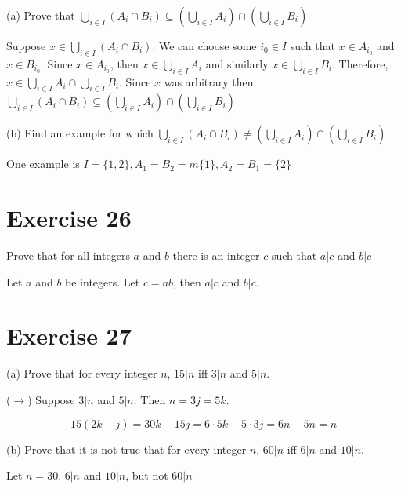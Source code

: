\documentclass[11pt]{article}
\begin{document}
\noindent (a) Prove that 
$\bigcup_{i \in I} (A_i \cap B_i) \subseteq (\bigcup_{i \in I} A_i) \cap (\bigcup_{i \in I} B_i)$

Suppose $x \in \bigcup_{i \in I} (A_i \cap B_i)$. We can choose some $i_0 \in I$ 
such that $x \in A_{i_0}$ and $x \in B_{i_0}$. Since $x \in A_{i_0}$, then 
$x \in \bigcup_{i \in I} A_i$ and similarly $x \in \bigcup_{i \in I} B_i$.
Therefore, $x \in \bigcup_{i \in I} A_i \cap \bigcup_{i \in I} B_i$.
Since $x$ was arbitrary then 
$\bigcup_{i \in I} (A_i \cap B_i) \subseteq (\bigcup_{i \in I} A_i) \cap (\bigcup_{i \in I} B_i)$

\noindent (b) Find an example for which 
$\bigcup_{i \in I} (A_i \cap B_i) \neq (\bigcup_{i \in I} A_i) \cap (\bigcup_{i \in I} B_i)$

One example is $I = \{ 1, 2 \}, A_1 = B_2 =m \{1\}, A_2 = B_1 = \{2\}$

\section*{Exercise 26}

Prove that for all integers $a$ and $b$ there is an integer $c$ such that $a | c$
and $b | c$

Let $a$ and $b$ be integers. Let $c = ab$, then $a | c$ and $b | c$.

\section*{Exercise 27}

\noindent (a) Prove that for every integer $n$, $15 | n$ iff $3 | n$ and $5 | n $.

($\rightarrow$) Suppose $3 | n$ and $5 | n$. Then $n = 3j = 5k$. 

$$15 (2k - j) = 30k - 15j = 6 \cdot 5k - 5 \cdot 3j = 6n - 5n = n$$

\noindent (b) Prove that it is not true that for every integer $n$, $60 | n$ iff
$6 | n$ and $10 | n$.

Let $n = 30$. $6 | n$ and $10 | n$, but not $60 | n$
\end{document}
